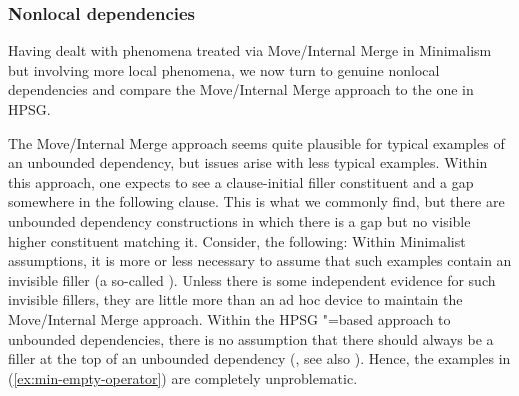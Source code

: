 \documentclass[output=paper
                ,modfonts
                ,nonflat
	        ,collection
	        ,collectionchapter
	        ,collectiontoclongg
 	        ,biblatex
                ,babelshorthands
                ,newtxmath
                ,draftmode
                ,colorlinks, citecolor=brown
]{./langsci/langscibook}
\begin{document}
\subsubsection{Nonlocal dependencies}

Having dealt with phenomena treated via Move/Internal Merge in Minimalism but involving more local
phenomena, we now turn to genuine nonlocal dependencies and compare the Move/Internal Merge approach
to the one in HPSG.


The Move/Internal Merge approach seems quite plausible for typical examples of an unbounded
dependency, but issues arise with less typical examples. Within this approach, one expects to see a clause-initial filler constituent and a gap somewhere in the following clause. This is what we commonly
find, but there are unbounded dependency constructions in which there is a gap but no visible higher
constituent matching it. Consider, \eg the following: 
\eal\label{ex:min-empty-operator}
\zl 
Within Minimalist assumptions, it is more or less necessary to assume that such examples contain an
invisible filler (a so-called ). Unless there is some independent evidence for such
invisible fillers, they are little more than an ad hoc device to maintain the Move/Internal Merge
approach. Within the HPSG \slasch"=based approach to unbounded dependencies, there is no assumption
that there should always be a filler at the top of an unbounded dependency (\citealp[Chapter~4]{ps2}, see also ). Hence, the examples in
(\ref{ex:min-empty-operator}) are completely unproblematic. 

\end{document}
